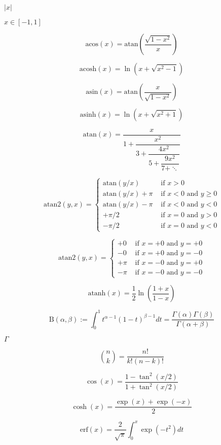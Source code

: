 \documentclass{article}
\begin{document}
$ |x| $
\pagebreak

$ x \in [-1,1] $
\pagebreak

\[ \text{acos}(x) = \text{atan} \left( \frac{\sqrt{1-x^2}}{x} \right) \]
\pagebreak

\[ \text{acosh}(x) = \ln \left( x + \sqrt{x^2 - 1} \right) \]
\pagebreak

\[ \text{asin}(x) = \text{atan} \left( \frac{x}{\sqrt{1-x^2}} \right) \]
\pagebreak

\[ \text{asinh}(x) = \ln \left( x + \sqrt{x^2 + 1} \right) \]
\pagebreak

\[ \text{atan}(x) = \dfrac{x}{1 + \dfrac{x^2}{3 + \dfrac{4x^2}{5 + \dfrac{9x^2}{7 + \ddots}}}} \]
\pagebreak

\[ \text{atan2}(y,x) = \begin{cases} \text{atan}(y/x) & \text{ if } x > 0 \\ \text{atan}(y/x) + \pi & \text{ if } x < 0 \text{ and } y \geq 0 \\ \text{atan}(y/x) - \pi & \text{ if } x < 0 \text{ and } y < 0 \\ + \pi/2 & \text{ if } x = 0 \text{ and } y > 0 \\ - \pi/2 & \text{ if } x = 0 \text{ and } y < 0 \end{cases} \]
\pagebreak

\[ \text{atan2}(y,x) = \begin{cases} +0 & \text{ if } x = +0 \text{ and } y = +0 \\ -0 & \text{ if } x = +0 \text{ and } y = -0 \\ +\pi & \text{ if } x = -0 \text{ and } y = +0 \\ - \pi & \text{ if } x = -0 \text{ and } y = -0 \end{cases} \]
\pagebreak

\[ \text{atanh}(x) = \frac{1}{2} \ln \left( \frac{1+x}{1-x} \right) \]
\pagebreak

\[ \text{B}(\alpha,\beta) := \int_0^1 t^{\alpha - 1} (1-t)^{\beta - 1} dt = \frac{\Gamma(\alpha)\Gamma(\beta)}{\Gamma(\alpha + \beta)} \]
\pagebreak

$ \Gamma $
\pagebreak

\[ \binom{n}{k} = \frac{n!}{k!(n-k)!} \]
\pagebreak

\[ \cos(x) = \frac{1-\tan^2(x/2)}{1+\tan^2(x/2)} \]
\pagebreak

\[ \cosh(x) = \frac{\exp(x) + \exp(-x)}{2} \]
\pagebreak

\[ \text{erf}(x) = \frac{2}{\sqrt{\pi}} \int_0^x \exp( - t^2) dt \]
\pagebreak
\end{document}
